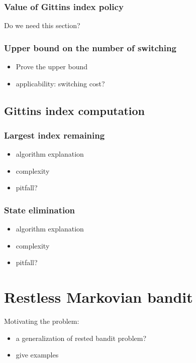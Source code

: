 \subsubsection{Value of Gittins index policy}

Do we need this section?

\subsubsection{Upper bound on the number of switching}

\begin{itemize}
    \item Prove the upper bound
    \item applicability: switching cost?
\end{itemize}

\subsection{Gittins index computation}

\subsubsection{Largest index remaining}

\begin{itemize}
    \item algorithm explanation
    \item complexity
    \item pitfall?
\end{itemize}

\subsubsection{State elimination}

\begin{itemize}
    \item algorithm explanation
    \item complexity
    \item pitfall?
\end{itemize}

\section{Restless Markovian bandit}
\label{sec:restless_mab_pb}

Motivating the problem:
\begin{itemize}
    \item a generalization of rested bandit problem?
    \item give examples
\end{itemize}

